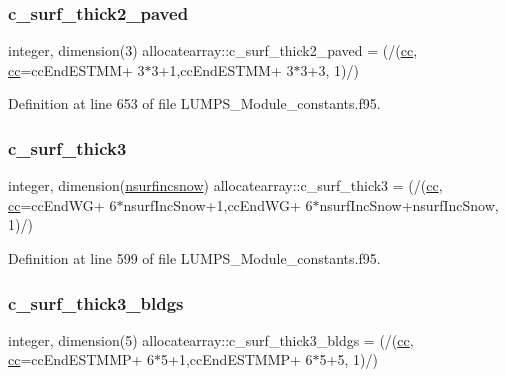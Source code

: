 \subsubsection{\texorpdfstring{c\+\_\+surf\+\_\+thick2\+\_\+paved}{c\_surf\_thick2\_paved}}
{\footnotesize\ttfamily integer, dimension(3) allocatearray\+::c\+\_\+surf\+\_\+thick2\+\_\+paved = (/(\hyperlink{namespaceallocatearray_ac863c81704eb507dee10f5e10741e10c}{cc}, \hyperlink{namespaceallocatearray_ac863c81704eb507dee10f5e10741e10c}{cc}=cc\+End\+E\+S\+T\+MM+ 3$\ast$3+1,cc\+End\+E\+S\+T\+MM+ 3$\ast$3+3, 1)/)}



Definition at line 653 of file L\+U\+M\+P\+S\+\_\+\+Module\+\_\+constants.\+f95.

\mbox{\label{namespaceallocatearray_a6e64c0458fe3780a6b81c02c9c18c87f}} 
\subsubsection{\texorpdfstring{c\+\_\+surf\+\_\+thick3}{c\_surf\_thick3}}
{\footnotesize\ttfamily integer, dimension(\hyperlink{namespaceallocatearray_af4d113f332b6759cfa22271140c9162d}{nsurfincsnow}) allocatearray\+::c\+\_\+surf\+\_\+thick3 = (/(\hyperlink{namespaceallocatearray_ac863c81704eb507dee10f5e10741e10c}{cc}, \hyperlink{namespaceallocatearray_ac863c81704eb507dee10f5e10741e10c}{cc}=cc\+End\+WG+ 6$\ast$nsurf\+Inc\+Snow+1,cc\+End\+WG+ 6$\ast$nsurf\+Inc\+Snow+nsurf\+Inc\+Snow, 1)/)}



Definition at line 599 of file L\+U\+M\+P\+S\+\_\+\+Module\+\_\+constants.\+f95.

\mbox{\label{namespaceallocatearray_a2cd78a5f2dd77b5bb37d6c6ced2829b5}} 
\subsubsection{\texorpdfstring{c\+\_\+surf\+\_\+thick3\+\_\+bldgs}{c\_surf\_thick3\_bldgs}}
{\footnotesize\ttfamily integer, dimension(5) allocatearray\+::c\+\_\+surf\+\_\+thick3\+\_\+bldgs = (/(\hyperlink{namespaceallocatearray_ac863c81704eb507dee10f5e10741e10c}{cc}, \hyperlink{namespaceallocatearray_ac863c81704eb507dee10f5e10741e10c}{cc}=cc\+End\+E\+S\+T\+M\+MP+ 6$\ast$5+1,cc\+End\+E\+S\+T\+M\+MP+ 6$\ast$5+5, 1)/)}




